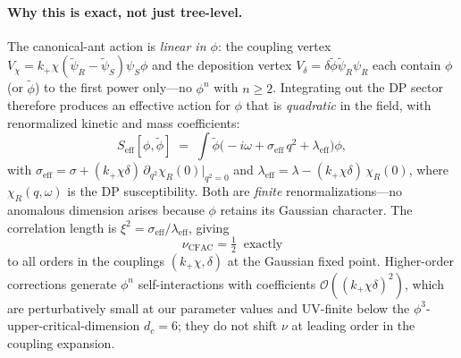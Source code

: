 \documentclass[10pt,a4paper,twocolumn]{article}
\newcommand{\phit}{\tilde\phi}
\newcommand{\psit}{\tilde\psi}
\theoremstyle{definition}
\begin{document}
\paragraph{Why this is exact, not just tree-level.}
The canonical-ant action is \emph{linear in $\phi$}: the coupling
vertex $V_\chi = k_+\chi(\psit_R-\psit_S)\psi_S\phi$ and the
deposition vertex $V_\delta = \delta\phit\psit_R\psi_R$ each
contain $\phi$ (or $\phit$) to the first power only---no
$\phi^n$ with $n\geq 2$.  Integrating out the DP sector
therefore produces an effective action for $\phi$ that is
\emph{quadratic} in the field, with renormalized kinetic and
mass coefficients:
\begin{equation}\label{eq:phi-eff}
  S_{\text{eff}}[\phi,\phit]
  \;=\; \int \phit \bigl(-i\omega + \sigma_{\text{eff}}\,q^2
                + \lambda_{\text{eff}}\bigr) \phi,
\end{equation}
with $\sigma_{\text{eff}} = \sigma + (k_+\chi\delta)\,
\partial_{q^2}\chi_R(0)|_{q^2=0}$ and
$\lambda_{\text{eff}} = \lambda - (k_+\chi\delta)\,\chi_R(0)$,
where $\chi_R(q,\omega)$ is the DP susceptibility.  Both are
\emph{finite} renormalizations---no anomalous dimension arises
because $\phi$ retains its Gaussian character.  The correlation
length is $\xi^2 = \sigma_{\text{eff}}/\lambda_{\text{eff}}$,
giving
\begin{equation}
  \boxed{\;\nu_{\text{CFAC}} = \tfrac{1}{2}\;\;\text{exactly}\;}
\end{equation}
to all orders in the couplings $(k_+\chi, \delta)$ at the
Gaussian fixed point.  Higher-order corrections generate
$\phi^n$ self-interactions with coefficients
$\mathcal{O}((k_+\chi\delta)^2)$, which are perturbatively
small at our parameter values and UV-finite below the
$\phi^3$-upper-critical-dimension $d_c = 6$; they do not shift
$\nu$ at leading order in the coupling expansion.
\end{document}
